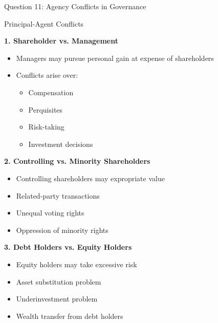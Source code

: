 \documentclass[aspectratio=169]{beamer}
\newcommand{\subquestion}[1]{{\bfseries\color{darkgreen}#1}}
\begin{document}
	\begin{frame}{Question 11: Agency Conflicts in Governance}
		
		\begin{block}{Principal-Agent Conflicts}
			
			\subquestion{1. Shareholder vs. Management}
			\begin{itemize}
				\item Managers may pursue personal gain at expense of shareholders
				\item Conflicts arise over:
				\begin{itemize}
					\item Compensation
					\item Perquisites
					\item Risk-taking
					\item Investment decisions
				\end{itemize}
			\end{itemize}
			
			\subquestion{2. Controlling vs. Minority Shareholders}
			\begin{itemize}
				\item Controlling shareholders may expropriate value
				\item Related-party transactions
				\item Unequal voting rights
				\item Oppression of minority rights
			\end{itemize}
			
			\subquestion{3. Debt Holders vs. Equity Holders}
			\begin{itemize}
				\item Equity holders may take excessive risk
				\item Asset substitution problem
				\item Underinvestment problem
				\item Wealth transfer from debt holders
			\end{itemize}
		\end{block}
	\end{frame}
	
\end{document}
